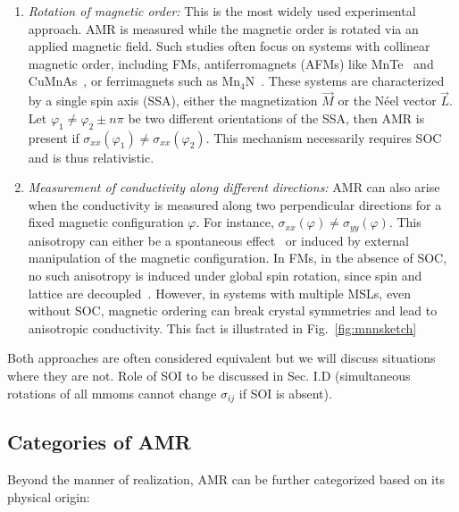 \documentclass[prb,showpacs,amsmath,amssymb,superscriptaddress,twocolumn,floatfix]{revtex4-1}
\begin{document}
\begin{enumerate}
	\item \textit{Rotation of magnetic order:} This is the most widely used experimental approach. AMR is measured while the magnetic order is rotated via an applied magnetic field. Such studies often focus on systems with collinear magnetic order, including FMs, antiferromagnets (AFMs) like MnTe~\cite{Kriegner:2017, Gonzalez-Betancourt:2024} and CuMnAs~\cite{Volny:2020, Zubac:2021, Wadley:2016}, or ferrimagnets such as Mn$_4$N~\cite{Kabara:2017}. These systems are characterized by a single spin axis (SSA), either the magnetization $\vec{M}$ or the N\'eel vector $\vec{L}$. Let $\varphi_1 \neq \varphi_2 \pm n\pi$ be two different orientations of the SSA, then AMR is present if $\sigma_{xx}(\varphi_1) \neq \sigma_{xx}(\varphi_2)$. This mechanism necessarily requires SOC and is thus relativistic.
	
	\item \textit{Measurement of conductivity along different directions:} AMR can also arise when the conductivity is measured along two perpendicular directions for a fixed magnetic configuration $\varphi$. For instance, $\sigma_{xx}(\varphi) \neq \sigma_{yy}(\varphi)$. This anisotropy can either be a spontaneous effect~\cite{Bakonyi:2022} or induced by external manipulation of the magnetic configuration. In FMs, in the absence of SOC, no such anisotropy is induced under global spin rotation, since spin and lattice are decoupled~\cite{Gonzalez-Hernandez:2024}. However, in systems with multiple MSLs, even without SOC, magnetic ordering can break crystal symmetries and lead to anisotropic conductivity. This fact is illustrated in Fig.~\ref{fig:mnnsketch}
\end{enumerate}

{\color{red} Both approaches are often considered equivalent but we
  will discuss situations where they are not. Role of SOI to be
  discussed in Sec. I.D (simultaneous rotations of all mmoms cannot
  change $\sigma_{ij}$ if SOI is absent). }

\subsection{Categories of AMR}

Beyond the manner of realization, AMR can be further categorized based on its physical origin:
\end{document}
